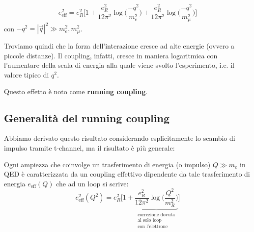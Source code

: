 \documentclass[../main.tex]{subfiles}
\begin{document}
\begin{equation}
    \boxed{
    e_\text{eff}^2 = e_R^2\bigg[ 1 + \frac{e_R^2}{12\pi^2}\log\bigg(\frac{- q^2}{m_e^2}\bigg) +  \frac{e_R^2}{12\pi^2}\log\bigg(\frac{- q^2}{m_\mu^2}\bigg)\bigg]}
    \label{eq:ee_mumu_runningcoupling}
\end{equation}
con \(-q^2 = |\Vec{q}|^2 \gg m_e^2, m_\mu^2 \).

Troviamo quindi che la forza dell'interazione cresce ad alte energie (ovvero a piccole distanze).
Il coupling, infatti, cresce in maniera logaritmica con l'aumentare della scala di energia alla quale viene svolto l'esperimento, i.e. il valore tipico di $q^2$.

Questo effetto è noto come \textbf{running coupling}.

\subsection{Generalità del running coupling}

Abbiamo derivato questo risultato considerando esplicitamente lo scambio di impulso tramite t-channel, ma il risultato è più generale:

Ogni ampiezza che coinvolge un trasferimento di energia (o impulso) $Q\gg m_e$ in QED è caratterizzata da un coupling effettivo dipendente da tale trasferimento di energia \(e_\text{eff}(Q)\) che ad un loop si scrive:
\begin{equation}
    e_\text{eff}^2(Q^2) = e_R^2\bigg[ 1 + 
    \underbrace{\frac{e_R^2}{12\pi^2}\log\bigg(\frac{Q^2}{m_R^2}\bigg)}_{\substack{\text{correzione dovuta}\\\text{al solo loop}\\\text{con l'elettrone}}}
    \bigg]
    \label{eq:general_runningcoupling_1loop}
\end{equation}
\end{document}
